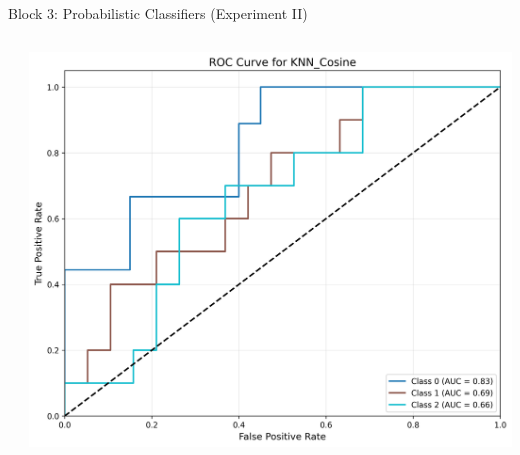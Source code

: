 \documentclass[9pt]{beamer}
\begin{document}
\begin{frame}{Block 3: Probabilistic Classifiers (Experiment II)}
\begin{columns}
\begin{column}{0.33\textwidth}
        \end{column}
        \begin{column}{0.33\textwidth}
            \centering
            \includegraphics[width=\textwidth]{code/ResultsMainAugZip/plots/Block3_Probabilistic_Experiment_II/roc_curve_KNN_Cosine.png}
        \end{column}
    \end{columns}
    \end{frame}
    
\end{document}

